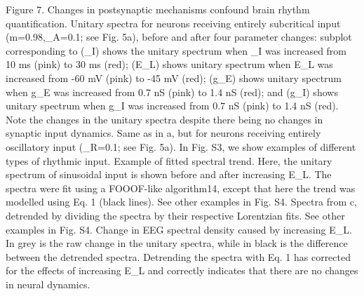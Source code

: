 Figure 7. Changes in postsynaptic mechanisms confound brain rhythm quantification.
	Unitary spectra for neurons receiving entirely subcritical input (m=0.98,\alpha_A=0.1; see Fig. 5a), before and after four parameter changes: subplot corresponding to (\uparrow\tau_I) shows the unitary spectrum when \tau_I  was increased from 10 ms (pink) to 30 ms (red); (\uparrow E_L) shows unitary spectrum when E_L was increased from -60 mV (pink) to -45 mV (red); (\uparrow g_E) shows unitary spectrum when g_E was increased from 0.7 nS (pink) to 1.4 nS (red); and (\uparrow g_I) shows unitary spectrum when g_I was increased from 0.7 nS (pink) to 1.4 nS (red). Note the changes in the unitary spectra despite there being no changes in synaptic input dynamics.
	Same as in a, but for neurons receiving entirely oscillatory input (\alpha_R=0.1; see Fig. 5a). In Fig. S3, we show examples of different types of rhythmic input.
	Example of fitted spectral trend. Here, the unitary spectrum of sinusoidal input is shown before and after increasing E_L. The spectra were fit using a FOOOF-like algorithm14, except that here the trend was modelled using Eq. 1 (black lines). See other examples in Fig. S4.
	Spectra from c, detrended by dividing the spectra by their respective Lorentzian fits. See other examples in Fig. S4.
	Change in EEG spectral density caused by increasing E_L. In grey is the raw change in the unitary spectra, while in black is the difference between the detrended spectra. Detrending the spectra with Eq. 1 has corrected for the effects of increasing E_L and correctly indicates that there are no changes in neural dynamics. 


